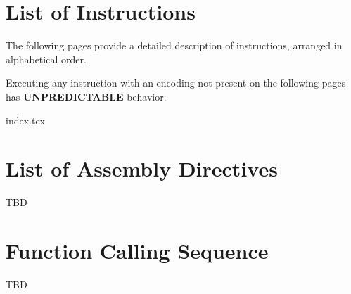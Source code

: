\documentclass[12pt,a4paper]{article}
\newcommand{\unpredictable}{\textbf{UNPREDICTABLE}}
\begin{document}
\pagebreak

\section{List of Instructions}
The following pages provide a detailed description of instructions, arranged in alphabetical order.

Executing any instruction with an encoding not present on the following pages has \unpredictable{} behavior.
\pagebreak

{index.tex}

\section{List of Assembly Directives}
TBD
\pagebreak

\section{Function Calling Sequence}
TBD
\pagebreak
\end{document}
